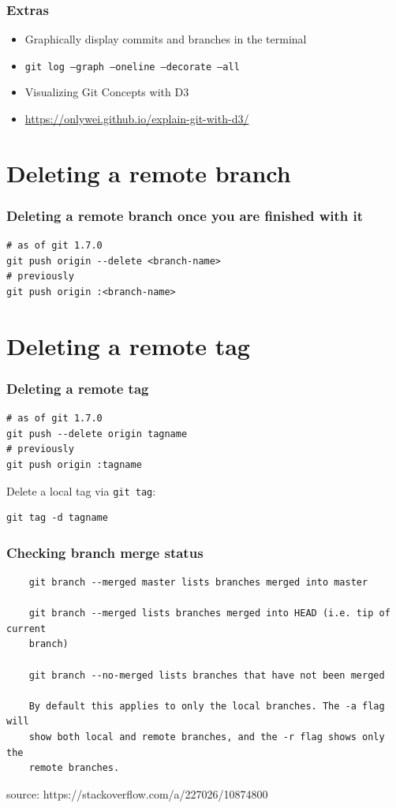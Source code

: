 \documentclass{git_course}
\begin{document}
\begin{frame}
    \frametitle{Extras}
    \begin{itemize}
        \item Graphically display commits and branches in the terminal
        \item \texttt{git log --graph --oneline --decorate --all}
        \item Visualizing Git Concepts with D3
        \item \url{https://onlywei.github.io/explain-git-with-d3/}
    \end{itemize}
\end{frame}

\section{Deleting a remote branch}

\begin{frame}[fragile]
    \frametitle{Deleting a remote branch once you are finished with it}

\begin{lstlisting}
# as of git 1.7.0
git push origin --delete <branch-name>
# previously
git push origin :<branch-name>
\end{lstlisting}
\end{frame}

\section{Deleting a remote tag}

\begin{frame}[fragile]
\frametitle{Deleting a remote tag}

\begin{lstlisting}
# as of git 1.7.0
git push --delete origin tagname
# previously
git push origin :tagname
\end{lstlisting}

Delete a local tag via \texttt{git tag}:
\begin{lstlisting}
git tag -d tagname
\end{lstlisting}
\end{frame}

\begin{frame}[fragile]
\frametitle{Checking branch merge status}
    \begin{lstlisting}
    git branch --merged master lists branches merged into master

    git branch --merged lists branches merged into HEAD (i.e. tip of current
    branch)

    git branch --no-merged lists branches that have not been merged

    By default this applies to only the local branches. The -a flag will
    show both local and remote branches, and the -r flag shows only the
    remote branches.
    \end{lstlisting}
    source: https://stackoverflow.com/a/227026/10874800
\end{frame}
\end{document}
